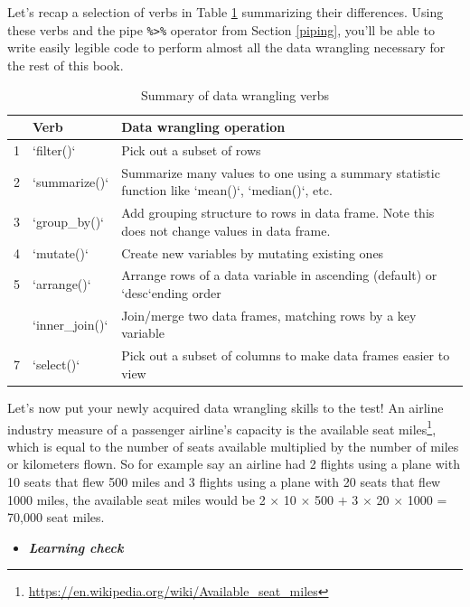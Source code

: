 \documentclass[12pt,]{krantz}
\renewcommand{\href}[2]{#2\footnote{\url{#1}}}
\newenvironment{rmdblock}[1]
  {\begin{shaded*}
  \begin{itemize}
  \renewcommand{\labelitemi}{
    \raisebox{-.7\height}[0pt][0pt]{
    }
  }
  \item
  }
  {
  \end{itemize}
  \end{shaded*}
  }
\newenvironment{learncheck}
  {\begin{rmdblock}{warning}}
  {\end{rmdblock}}
\theoremstyle{definition}
\theoremstyle{definition}
\theoremstyle{definition}
\theoremstyle{remark}
\begin{document}
Let's recap a selection of verbs in Table
\ref{tab:wrangle-summary-table} summarizing their differences. Using
these verbs and the pipe \texttt{\%\textgreater{}\%} operator from
Section \ref{piping}, you'll be able to write easily legible code to
perform almost all the data wrangling necessary for the rest of this
book.

\begin{table}[H]

\caption{\label{tab:wrangle-summary-table}Summary of data wrangling verbs}
\centering
\fontsize{10}{12}\selectfont
\begin{tabular}[t]{r>{\raggedright\arraybackslash}p{0.9in}>{\raggedright\arraybackslash}p{3.3in}}
\toprule
  & Verb & Data wrangling operation\\
\midrule
1 & `filter()` & Pick out a subset of rows\\
2 & `summarize()` & Summarize many values to one using a summary statistic function like `mean()`, `median()`, etc.\\
3 & `group\_by()` & Add grouping structure to rows in data frame. Note this does not change values in data frame.\\
4 & `mutate()` & Create new variables by mutating existing ones\\
5 & `arrange()` & Arrange rows of a data variable in ascending (default) or `desc`ending order\\
\addlinespace
6 & `inner\_join()` & Join/merge two data frames, matching rows by a key variable\\
7 & `select()` & Pick out a subset of columns to make data frames easier to view\\
\bottomrule
\end{tabular}
\end{table}

Let's now put your newly acquired data wrangling skills to the test! An
airline industry measure of a passenger airline's capacity is the
\href{https://en.wikipedia.org/wiki/Available_seat_miles}{available seat
miles}, which is equal to the number of seats available multiplied by
the number of miles or kilometers flown. So for example say an airline
had 2 flights using a plane with 10 seats that flew 500 miles and 3
flights using a plane with 20 seats that flew 1000 miles, the available
seat miles would be 2 \(\times\) 10 \(\times\) 500 \(+\) 3 \(\times\) 20
\(\times\) 1000 = 70,000 seat miles.

\begin{learncheck}
\textbf{\emph{Learning check}}
\end{learncheck}
\end{document}
